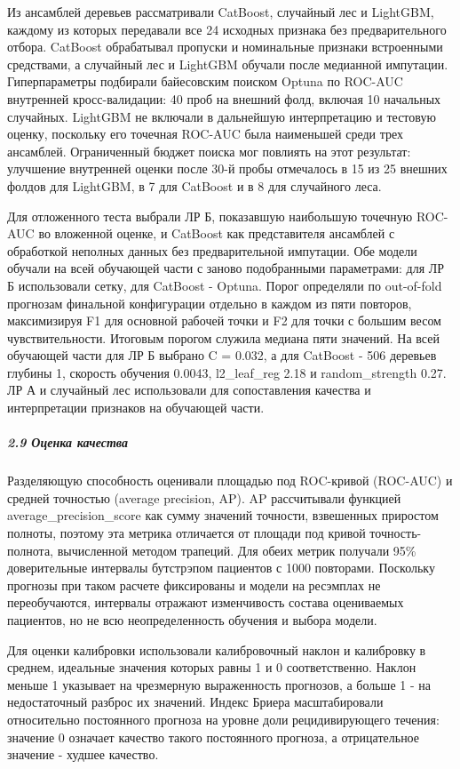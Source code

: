 \documentclass{crm-article}
\begin{document}
Из ансамблей деревьев рассматривали CatBoost, случайный лес и LightGBM, каждому из которых передавали все 24 исходных признака без предварительного отбора. CatBoost обрабатывал пропуски и номинальные признаки встроенными средствами, а случайный лес и LightGBM обучали после медианной импутации. Гиперпараметры подбирали байесовским поиском Optuna по ROC-AUC внутренней кросс-валидации: 40 проб на внешний фолд, включая 10 начальных случайных. LightGBM не включали в дальнейшую интерпретацию и тестовую оценку, поскольку его точечная ROC-AUC была наименьшей среди трех ансамблей. Ограниченный бюджет поиска мог повлиять на этот результат: улучшение внутренней оценки после 30-й пробы отмечалось в 15 из 25 внешних фолдов для LightGBM, в 7 для CatBoost и в 8 для случайного леса.

Для отложенного теста выбрали ЛР Б, показавшую наибольшую точечную ROC-AUC во вложенной оценке, и CatBoost как представителя ансамблей с обработкой неполных данных без предварительной импутации. Обе модели обучали на всей обучающей части с заново подобранными параметрами: для ЛР Б использовали сетку, для CatBoost - Optuna. Порог определяли по out-of-fold прогнозам финальной конфигурации отдельно в каждом из пяти повторов, максимизируя F1 для основной рабочей точки и F2 для точки с большим весом чувствительности. Итоговым порогом служила медиана пяти значений. На всей обучающей части для ЛР Б выбрано C = 0.032, а для CatBoost - 506 деревьев глубины 1, скорость обучения 0.0043, l2\_leaf\_reg 2.18 и random\_strength 0.27. ЛР А и случайный лес использовали для сопоставления качества и интерпретации признаков на обучающей части.

\subparagraph{2.9 Оценка качества}\label{subsec2_9}

Разделяющую способность оценивали площадью под ROC-кривой (ROC-AUC) и средней точностью (average precision, AP). AP рассчитывали функцией average\_precision\_score как сумму значений точности, взвешенных приростом полноты, поэтому эта метрика отличается от площади под кривой точность-полнота, вычисленной методом трапеций. Для обеих метрик получали 95\% доверительные интервалы бутстрэпом пациентов с 1000 повторами. Поскольку прогнозы при таком расчете фиксированы и модели на ресэмплах не переобучаются, интервалы отражают изменчивость состава оцениваемых пациентов, но не всю неопределенность обучения и выбора модели.

Для оценки калибровки использовали калибровочный наклон и калибровку в среднем, идеальные значения которых равны 1 и 0 соответственно. Наклон меньше 1 указывает на чрезмерную выраженность прогнозов, а больше 1 - на недостаточный разброс их значений. Индекс Бриера масштабировали относительно постоянного прогноза на уровне доли рецидивирующего течения: значение 0 означает качество такого постоянного прогноза, а отрицательное значение - худшее качество.
\end{document}
